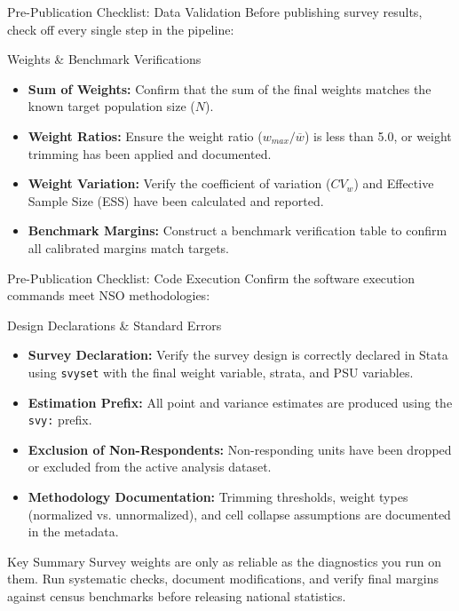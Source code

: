 \documentclass[10pt, aspectratio=169]{beamer}
\begin{document}
\begin{frame}{Pre-Publication Checklist: Data Validation}
  Before publishing survey results, check off every single step in the pipeline:
  \begin{block}{Weights \& Benchmark Verifications}
    \begin{itemize}
      \item[\checkmark] \textbf{Sum of Weights:} Confirm that the sum of the final weights matches the known target population size ($N$).
      \item[\checkmark] \textbf{Weight Ratios:} Ensure the weight ratio ($w_{max}/\overline{w}$) is less than 5.0, or weight trimming has been applied and documented.
      \item[\checkmark] \textbf{Weight Variation:} Verify the coefficient of variation ($CV_w$) and Effective Sample Size (ESS) have been calculated and reported.
      \item[\checkmark] \textbf{Benchmark Margins:} Construct a benchmark verification table to confirm all calibrated margins match targets.
    \end{itemize}
  \end{block}
\end{frame}

\begin{frame}{Pre-Publication Checklist: Code Execution}
  Confirm the software execution commands meet NSO methodologies:
  \begin{block}{Design Declarations \& Standard Errors}
    \begin{itemize}
      \item[\checkmark] \textbf{Survey Declaration:} Verify the survey design is correctly declared in Stata using \texttt{svyset} with the final weight variable, strata, and PSU variables.
      \item[\checkmark] \textbf{Estimation Prefix:} All point and variance estimates are produced using the \texttt{svy:} prefix.
      \item[\checkmark] \textbf{Exclusion of Non-Respondents:} Non-responding units have been dropped or excluded from the active analysis dataset.
      \item[\checkmark] \textbf{Methodology Documentation:} Trimming thresholds, weight types (normalized vs. unnormalized), and cell collapse assumptions are documented in the metadata.
    \end{itemize}
  \end{block}
  \begin{alertblock}{Key Summary}
    Survey weights are only as reliable as the diagnostics you run on them. Run systematic checks, document modifications, and verify final margins against census benchmarks before releasing national statistics.
  \end{alertblock}
\end{frame}
\end{document}
